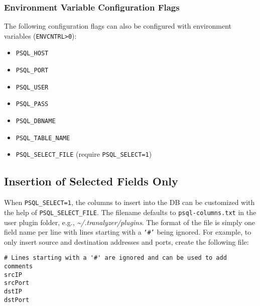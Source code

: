 \documentclass[documentation]{subfiles}
\begin{document}
\subsubsection{Environment Variable Configuration Flags}
The following configuration flags can also be configured with environment variables ({\tt ENVCNTRL>0}):
\begin{itemize}
    \item {\tt PSQL\_HOST}
    \item {\tt PSQL\_PORT}
    \item {\tt PSQL\_USER}
    \item {\tt PSQL\_PASS}
    \item {\tt PSQL\_DBNAME}
    \item {\tt PSQL\_TABLE\_NAME}
    \item {\tt PSQL\_SELECT\_FILE} (require {\tt PSQL\_SELECT=1})
\end{itemize}

\subsection{Insertion of Selected Fields Only}\label{psql:select}

When {\tt PSQL\_SELECT=1}, the columns to insert into the DB can be customized with the help of {\tt PSQL\_SELECT\_FILE}.
The filename defaults to {\tt psql-columns.txt} in the user plugin folder, e.g., {\em \textasciitilde{}/.tranalyzer/plugins}.
The format of the file is simply one field name per line with lines starting with a {\tt `\#'} being ignored.
For example, to only insert source and destination addresses and ports, create the following file:

\begin{verbatim}
# Lines starting with a '#' are ignored and can be used to add comments
srcIP
srcPort
dstIP
dstPort
\end{verbatim}
\end{document}
